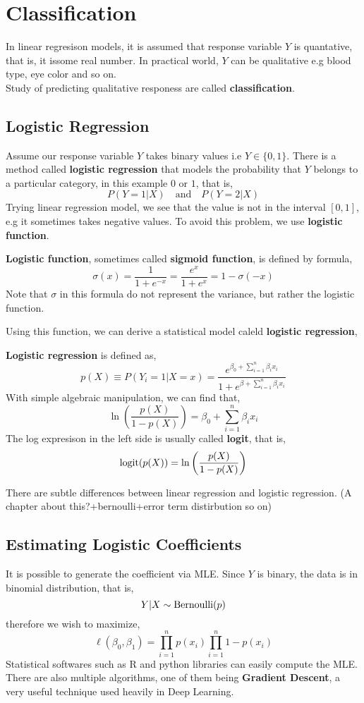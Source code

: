 \chapter{Classification}
In linear regresison models, it is assumed that response variable $Y$ is quantative, that is, it issome real number. In practical world, $Y$ can be qualitative e.g blood type, eye color and so on. \\
Study of predicting qualitative responess are called \textbf{classification}.
\section{Logistic Regression}
Assume our response variable $Y$ takes binary values i.e $Y \in \{0, 1 \}$. There is a method called \textbf{logistic regression} that models the probability that $Y$ belongs to a particular category, in this example $0$ or $1$, that is,
\[P(Y = 1| X ) \quad \text{and} \quad P(Y = 2| X) \]
Trying linear regression model, we see that the value is not in the interval $[0,1]$, e.g it sometimes takes negative values. To avoid this problem, we use \textbf{logistic function}.
\begin{definition}
    \textbf{Logistic function}, sometimes called \textbf{sigmoid function}, is  defined by formula,
    \[\sigma(x)  = \frac{1}{1+e^{-x}} = \frac{e^x}{1+e^x} = 1 - \sigma(-x)\]
Note that $\sigma$ in this formula do not represent the variance, but rather the logistic function.
\end{definition}
Using this function, we can derive a statistical model caleld \textbf{logistic regression},
\begin{definition}
    \textbf{Logistic regression} is defined as,
    \[ p(X) \equiv P(Y_i = 1| X = x) = \frac{e^{\beta_0 + \sum_{i=1}^n\beta_i x_i}} {1+e^{\beta + \sum_{i=1}^n\beta_i x_i}} \]
    With simple algebraic manipulation, we can find that,
    \[ \ln\left( \frac{p(X)}{1-p(X)}\right) = \beta_0 +\sum_{i=1}^n\beta_i x_i\]
    The log expresison in the left side is usually called \textbf{logit}, that is,
    \[\operatorname{logit}(p(X))= \ln\left( \frac{p(X)}{1-p(X)}\right)\]
\end{definition}
There are subtle differences between linear regression and logistic regression. (A chapter about this?+bernoulli+error term distirbution so on)
\section{Estimating Logistic Coefficients}
It is possible to generate the coefficient via MLE. Since $Y$ is binary, the data is in binomial distribution, that is,
\[ Y | X \sim \operatorname{Bernoulli}(p)\]
therefore we wish to maximize,
\[ \ell(\beta_0, \beta_1) = \prod_{i = 1}^n p(x_i) \prod_{i = 1}^n 1-p(x_i) \]
Statistical softwares such as R and python libraries can easily compute the MLE. There are also multiple algorithms, one of them being \textbf{Gradient Descent}, a very useful technique used heavily in Deep Learning.
